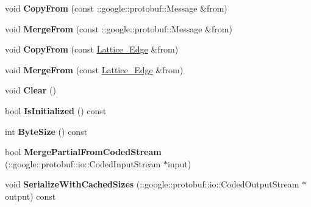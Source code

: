 \begin{DoxyCompactItemize}
\item 
\hypertarget{classlattice_1_1Lattice__Edge_a4f12ea2d09f06458eaf599bbd6140d09}{
void {\bfseries CopyFrom} (const ::google::protobuf::Message \&from)}
\label{classlattice_1_1Lattice__Edge_a4f12ea2d09f06458eaf599bbd6140d09}

\item 
\hypertarget{classlattice_1_1Lattice__Edge_acb2a52debadf89e32673ed4681a785de}{
void {\bfseries MergeFrom} (const ::google::protobuf::Message \&from)}
\label{classlattice_1_1Lattice__Edge_acb2a52debadf89e32673ed4681a785de}

\item 
\hypertarget{classlattice_1_1Lattice__Edge_a6a8426745b646d96dbea6931daaa33f9}{
void {\bfseries CopyFrom} (const \hyperlink{classlattice_1_1Lattice__Edge}{Lattice\_\-Edge} \&from)}
\label{classlattice_1_1Lattice__Edge_a6a8426745b646d96dbea6931daaa33f9}

\item 
\hypertarget{classlattice_1_1Lattice__Edge_ad910840c5215e942e5fad4b9119a4094}{
void {\bfseries MergeFrom} (const \hyperlink{classlattice_1_1Lattice__Edge}{Lattice\_\-Edge} \&from)}
\label{classlattice_1_1Lattice__Edge_ad910840c5215e942e5fad4b9119a4094}

\item 
\hypertarget{classlattice_1_1Lattice__Edge_a7780ee7c3441cce937784a92dda3fcad}{
void {\bfseries Clear} ()}
\label{classlattice_1_1Lattice__Edge_a7780ee7c3441cce937784a92dda3fcad}

\item 
\hypertarget{classlattice_1_1Lattice__Edge_a2a52f5e8c864ae50e31f7e0a5b5ece95}{
bool {\bfseries IsInitialized} () const }
\label{classlattice_1_1Lattice__Edge_a2a52f5e8c864ae50e31f7e0a5b5ece95}

\item 
\hypertarget{classlattice_1_1Lattice__Edge_a7342ae6a37ed9b432cdd4bacb58956b8}{
int {\bfseries ByteSize} () const }
\label{classlattice_1_1Lattice__Edge_a7342ae6a37ed9b432cdd4bacb58956b8}

\item 
\hypertarget{classlattice_1_1Lattice__Edge_ab3f9dc6f28a5d5e7356beb27f6cbdf3f}{
bool {\bfseries MergePartialFromCodedStream} (::google::protobuf::io::CodedInputStream $\ast$input)}
\label{classlattice_1_1Lattice__Edge_ab3f9dc6f28a5d5e7356beb27f6cbdf3f}

\item 
\hypertarget{classlattice_1_1Lattice__Edge_aa425ac46616eb3cbdc3e17b5536991c0}{
void {\bfseries SerializeWithCachedSizes} (::google::protobuf::io::CodedOutputStream $\ast$output) const }
\label{classlattice_1_1Lattice__Edge_aa425ac46616eb3cbdc3e17b5536991c0}


\end{DoxyCompactItemize}
